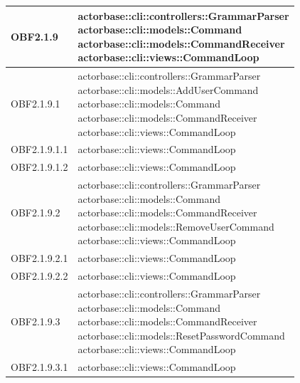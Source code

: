 \documentclass{scalatekids-article}
\begin{document}
\begin{longtable}[H]{|p{5cm}|p{12cm}|}
\hline
OBF2.1.9 & \multiLineCell[t]{actorbase::cli::controllers::GrammarParser\\actorbase::cli::models::Command\\actorbase::cli::models::CommandReceiver\\actorbase::cli::views::CommandLoop\\}\\
\hline
OBF2.1.9.1 & \multiLineCell[t]{actorbase::cli::controllers::GrammarParser\\actorbase::cli::models::AddUserCommand\\actorbase::cli::models::Command\\actorbase::cli::models::CommandReceiver\\actorbase::cli::views::CommandLoop\\}\\
\hline
OBF2.1.9.1.1 & \multiLineCell[t]{actorbase::cli::views::CommandLoop\\}\\
\hline
OBF2.1.9.1.2 & \multiLineCell[t]{actorbase::cli::views::CommandLoop\\}\\
\hline
OBF2.1.9.2 & \multiLineCell[t]{actorbase::cli::controllers::GrammarParser\\actorbase::cli::models::Command\\actorbase::cli::models::CommandReceiver\\actorbase::cli::models::RemoveUserCommand\\actorbase::cli::views::CommandLoop\\}\\
\hline
OBF2.1.9.2.1 & \multiLineCell[t]{actorbase::cli::views::CommandLoop\\}\\
\hline
OBF2.1.9.2.2 & \multiLineCell[t]{actorbase::cli::views::CommandLoop\\}\\
\hline
OBF2.1.9.3 & \multiLineCell[t]{actorbase::cli::controllers::GrammarParser\\actorbase::cli::models::Command\\actorbase::cli::models::CommandReceiver\\actorbase::cli::models::ResetPasswordCommand\\actorbase::cli::views::CommandLoop\\}\\
\hline
OBF2.1.9.3.1 & \multiLineCell[t]{actorbase::cli::views::CommandLoop\\}\\

\end{longtable}
\end{document}
